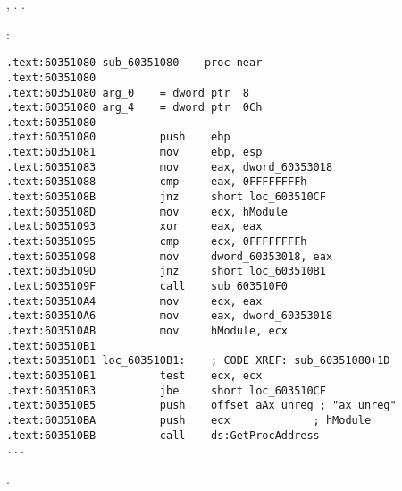 ,  . 
 .

:

\begin{lstlisting}
.text:60351080 sub_60351080    proc near
.text:60351080
.text:60351080 arg_0    = dword ptr  8
.text:60351080 arg_4    = dword ptr  0Ch
.text:60351080
.text:60351080          push    ebp
.text:60351081          mov     ebp, esp
.text:60351083          mov     eax, dword_60353018
.text:60351088          cmp     eax, 0FFFFFFFFh
.text:6035108B          jnz     short loc_603510CF
.text:6035108D          mov     ecx, hModule
.text:60351093          xor     eax, eax
.text:60351095          cmp     ecx, 0FFFFFFFFh
.text:60351098          mov     dword_60353018, eax
.text:6035109D          jnz     short loc_603510B1
.text:6035109F          call    sub_603510F0
.text:603510A4          mov     ecx, eax
.text:603510A6          mov     eax, dword_60353018
.text:603510AB          mov     hModule, ecx
.text:603510B1
.text:603510B1 loc_603510B1:    ; CODE XREF: sub_60351080+1D
.text:603510B1          test    ecx, ecx
.text:603510B3          jbe     short loc_603510CF
.text:603510B5          push    offset aAx_unreg ; "ax_unreg"
.text:603510BA          push    ecx             ; hModule
.text:603510BB          call    ds:GetProcAddress
...
\end{lstlisting}

.

